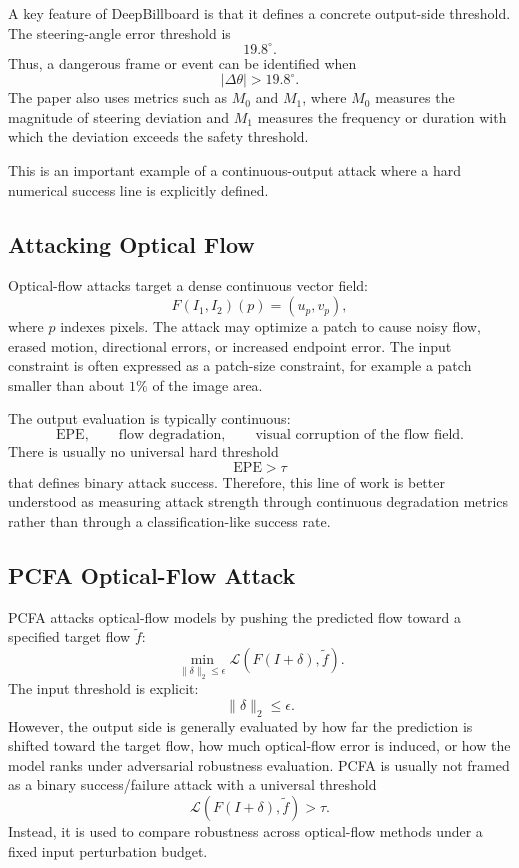 \documentclass{article}
\begin{document}
A key feature of DeepBillboard is that it defines a concrete output-side threshold. The steering-angle error threshold is
\[
    19.8^\circ.
\]
Thus, a dangerous frame or event can be identified when
\[
    |\Delta\theta|>19.8^\circ.
\]
The paper also uses metrics such as \(M_0\) and \(M_1\), where \(M_0\) measures the magnitude of steering deviation and \(M_1\) measures the frequency or duration with which the deviation exceeds the safety threshold.

This is an important example of a continuous-output attack where a hard numerical success line is explicitly defined.

\subsection{Attacking Optical Flow}

Optical-flow attacks target a dense continuous vector field:
\[
    F(I_1,I_2)(p)=(u_p,v_p),
\]
where \(p\) indexes pixels. The attack may optimize a patch to cause noisy flow, erased motion, directional errors, or increased endpoint error. The input constraint is often expressed as a patch-size constraint, for example a patch smaller than about \(1\%\) of the image area.

The output evaluation is typically continuous:
\[
    \mathrm{EPE},
    \qquad
    \text{flow degradation},
    \qquad
    \text{visual corruption of the flow field}.
\]
There is usually no universal hard threshold
\[
    \mathrm{EPE}>\tau
\]
that defines binary attack success. Therefore, this line of work is better understood as measuring attack strength through continuous degradation metrics rather than through a classification-like success rate.

\subsection{PCFA Optical-Flow Attack}

PCFA attacks optical-flow models by pushing the predicted flow toward a specified target flow \(\tilde f\):
\[
    \min_{\|\delta\|_2\leq \epsilon}
    \mathcal{L}(F(I+\delta),\tilde f).
\]
The input threshold is explicit:
\[
    \|\delta\|_2\leq \epsilon.
\]
However, the output side is generally evaluated by how far the prediction is shifted toward the target flow, how much optical-flow error is induced, or how the model ranks under adversarial robustness evaluation. PCFA is usually not framed as a binary success/failure attack with a universal threshold
\[
    \mathcal{L}(F(I+\delta),\tilde f)>\tau.
\]
Instead, it is used to compare robustness across optical-flow methods under a fixed input perturbation budget.
\end{document}
